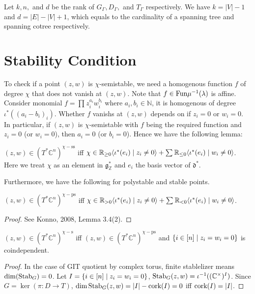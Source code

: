 \documentclass[b5paper]{article}
\newcommand{\sstab}{\mathrm{ss}}
\newcommand{\pstab}{\mathrm{ps}}
\newcommand{\stab}{\mathrm{s}}
\newcommand{\Stab}{\textnormal{Stab}}
\newcommand{\cork}{\textnormal{cork}}
\begin{document}
Let $k,n,$ and $d$ be the rank of $G_\Gamma,D_\Gamma,$ and $T_\Gamma$ respectively. We have $k=|V|-1$ and $d=|E|-|V|+1$, which equals to the cardinality of a spanning tree and spanning cotree respectively. 


\section{Stability Condition}

To check if a point $(z,w)$ is $\chi$-semistable, we need a homogenous function $f$ of degree $\chi$ that does not vanish at $(z,w)$. Note that $f\in \textnormal{Fun}\mu^{-1}(\lambda)$ is affine. Consider monomial $f=\prod_{}^{}z_i^{a_i}w_i^{b_i}$ where $a_i,b_i\in \mathbb{N}$, it is homogenous of degree $\iota^*((a_i-b_i)_i)$. Whether $f$ vanishs at $(z,w)$ depends on if $z_i=0$ or $w_i=0$. In particular, if $(z,w)$ is $\chi$-semistable with $f$ being the required function and $z_i=0$ (or $w_i=0$), then $a_i=0$ (or $b_i=0$). Hence we have the following lemma:

\begin{lemma}{}
  $(z,w)\in (T^*\mathbb{C}^n)^{\chi-\sstab}$  iff $\chi\in \mathbb{R}_{\geq 0}\langle \iota^{*}(e_i)\mid z_i\neq 0\rangle+\sum_{}^{}\mathbb{R}_{\leq 0}\langle \iota^{*}(e_i)\mid w_i\neq 0\rangle$. Here we treat $\chi$ as an element in $\mathfrak{g}^*_{\mathbb{Z}}$ and $e_i$ the basis vector of $\mathfrak{d}^*$.
\end{lemma}

Furthermore, we have the following for polystable and stable points.

\begin{proposition}[pps:]{}
  $(z,w)\in (T^*\mathbb{C}^n)^{\chi-\pstab}$  iff $\chi\in \mathbb{R}_{> 0}\langle \iota^{*}(e_i)\mid z_i\neq 0\rangle+\sum_{}^{}\mathbb{R}_{< 0}\langle \iota^{*}(e_i)\mid w_i\neq 0\rangle$.
  \begin{proof}
    See Konno, 2008, Lemma 3.4(2).
  \end{proof}
\end{proposition}

\begin{proposition}[pps:]{}
  $(z,w)\in (T^*\mathbb{C}^n)^{\chi-\stab}$ iff $(z,w)\in (T^*\mathbb{C}^n)^{\chi-\pstab}$ and $\left\{i\in [n]\mid z_i=w_i=0\right\}$ is coindependent.
  \begin{proof}
    In the case of GIT quotient by complex torus, finite stablelizer means $\dim(\Stab_G)=0$. Let $I=\left\{i\in [n] \mid z_i=w_i=0\right\}$, $\Stab_G(z,w)=\iota^{-1}((\mathbb{C}^\times )^I)$. Since $G=\ker(\pi:D\rightarrow T)$, $\dim\Stab_G(z,w)=|I|-\cork(I)=0$ iff $\cork(I)=|I|$.
  \end{proof}
\end{proposition}
\end{document}

